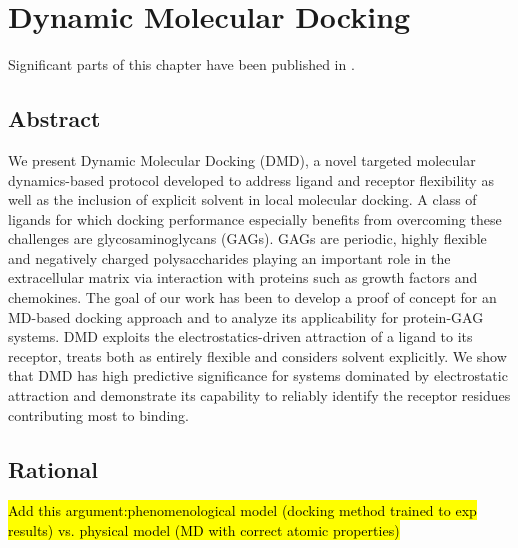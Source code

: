\chapter{Dynamic Molecular Docking}

Significant parts of this chapter have been published in \cite{
dmd_samsonov_gehrcke_2014}.


\section{Abstract}
We present Dynamic Molecular Docking (DMD), a novel
targeted molecular dy\-namics-based protocol developed to address ligand and
receptor flexibility as well as the inclusion of explicit solvent in local
molecular docking. A class of ligands for which docking performance especially
benefits from overcoming these challenges are glycosaminoglycans (GAGs). GAGs
are periodic, highly flexible and negatively charged polysaccharides playing an
important role in the extracellular matrix via interaction with proteins such as
growth factors and chemokines. The goal of our work has been to develop a proof
of concept for an MD-based docking approach and to analyze its applicability for
protein-GAG systems. DMD exploits the electrostatics-driven attraction of a
ligand to its receptor, treats both as entirely flexible and considers solvent
explicitly. We show that DMD has high predictive significance for systems
dominated by electrostatic attraction and demonstrate its capability to reliably
identify the receptor residues contributing most to binding.

\section{Rational}

\hl{Add this argument:phenomenological model (docking method trained to exp
results) vs. physical model (MD with correct atomic properties)}

